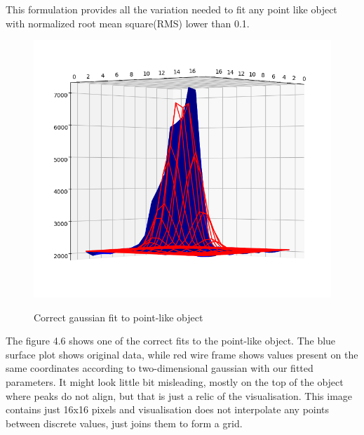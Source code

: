 \documentclass[12pt, a4paper, oneside]{book}
\begin{document}
This formulation provides all the variation needed to fit any point like object with normalized root mean square(RMS) lower than 0.1.

\begin{figure}[H]
    \begin{center}
        \includegraphics[scale=2.00]{images/gauss_point.png}
        \label{img:gauss_point}
        \caption{Correct gaussian fit to point-like object}
    \end{center}
\end{figure}

The figure 4.6 shows one of the correct fits to the point-like object.
The blue surface plot shows original data, while red wire frame shows values present on the same coordinates according to two-dimensional gaussian with our fitted parameters.
It might look little bit misleading, mostly on the top of the object where peaks do not align, but that is just a relic of the visualisation.
This image contains just 16x16 pixels and visualisation does not interpolate any points between discrete values, just joins them to form a grid.
\end{document}

